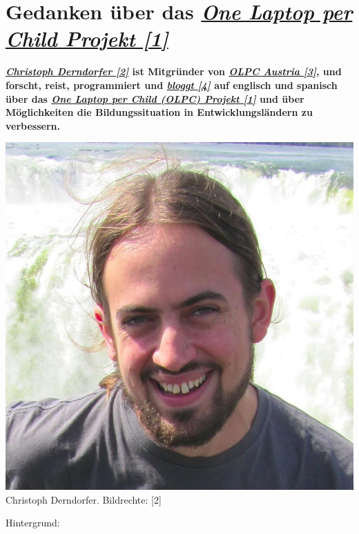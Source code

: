 \section*{Gedanken über das \href{http://one.laptop.org/}{\textit{One Laptop per Child Projekt [1]}}}
\hypertarget{olpcnewyear}{}
\label{olpcnewyear}

\textbf{\href{http://christoph-d.blogspot.co.at/}{\textit{Christoph Derndorfer [2]}} ist Mitgründer von \href{http://olpc.at/?setlang=de}{\textit{OLPC Austria [3]}}, und forscht, reist, programmiert und \href{http://www.olpcnews.com/}{\textit{bloggt [4]}} auf englisch und spanisch über das \href{http://one.laptop.org/}{\textit{One Laptop per Child (OLPC) Projekt [1]}} und über Möglichkeiten die Bildungssituation in Entwicklungsländern zu verbessern.} \\

\begin{center}
\includegraphics[width=\linewidth]{olpcnewyear/olpc-christoph.jpg} \\
\footnotesize{Christoph Derndorfer. Bildrechte: [2]}
\end{center}

Hintergrund: \\

